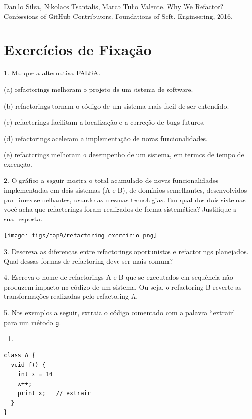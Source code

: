 \documentclass[
  11pt,
  twoside]{book}
\newcommand{\passthrough}[1]{#1}
\providecommand{\tightlist}{%
  \setlength{\itemsep}{0pt}\setlength{\parskip}{0pt}}
\begin{document}
Danilo Silva, Nikolaos Tsantalis, Marco Tulio Valente. Why We Refactor?
Confessions of GitHub Contributors. Foundations of Soft. Engineering,
2016.

\hypertarget{exercuxedcios-de-fixauxe7uxe3o-8}{%
\section*{Exercícios de
Fixação}\label{exercuxedcios-de-fixauxe7uxe3o-8}}

1. Marque a alternativa FALSA:

(a) refactorings melhoram o projeto de um sistema de software.

(b) refactorings tornam o código de um sistema mais fácil de ser
entendido.

(c) refactorings facilitam a localização e a correção de bugs futuros.

(d) refactorings aceleram a implementação de novas funcionalidades.

(e) refactorings melhoram o desempenho de um sistema, em termos de tempo
de execução.

2. O gráfico a seguir mostra o total acumulado de novas funcionalidades
implementadas em dois sistemas (A e B), de domínios semelhantes,
desenvolvidos por times semelhantes, usando as mesmas tecnologias. Em
qual dos dois sistemas você acha que refactorings foram realizados de
forma sistemática? Justifique a sua resposta.

\texttt{[image: figs/cap9/refactoring-exercicio.png]}

3. Descreva as diferenças entre refactorings oportunistas e refactorings
planejados. Qual dessas formas de refactoring deve ser mais comum?

4. Escreva o nome de refactorings A e B que se executados em sequência
não produzem impacto no código de um sistema. Ou seja, o refactoring B
reverte as transformações realizadas pelo refactoring A.

5. Nos exemplos a seguir, extraia o código comentado com a palavra
``extrair'' para um método \passthrough{\lstinline!g!}.

\begin{enumerate}
\def\labelenumi{(\alph{enumi})}
\tightlist
\item
\end{enumerate}

\begin{lstlisting}
class A {
  void f() {
    int x = 10
    x++;      
    print x;   // extrair
  }
}
\end{lstlisting}
\end{document}
